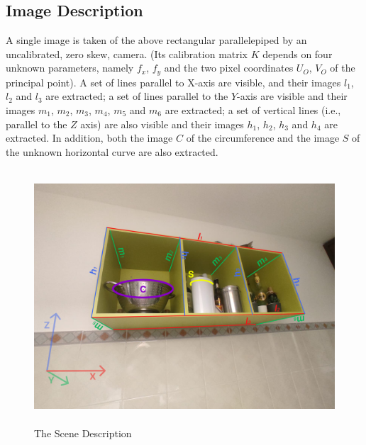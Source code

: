 \subsection{Image Description}
A single image is taken of the above rectangular parallelepiped by an uncalibrated, zero
skew, camera. (Its calibration matrix $K$ depends on four unknown parameters, namely $f_x$, $f_y$ and 
the two pixel coordinates $U_O$, $V_O$ of the principal point). A set of lines parallel to X-axis are visible, and their images $l_1$, $l_2$ and $l_3$ are extracted; a set of lines parallel to the $Y$-axis are visible and their images  $m_1$, $m_2$, $m_3$, $m_4$, $m_5$ and $m_6$ are extracted; a set of vertical lines (i.e., parallel to the $Z$
axis) are also visible and their images $h_1$, $h_2$, $h_3$ and $h_4$ are extracted.  In addition, both the image $C$ of the circumference and the image $S$ of the unknown horizontal curve are also extracted.  

\begin{figure}[!ht]
\centering
\includegraphics[height=9.5cm, width=\textwidth, keepaspectratio]{Report/Images/Introduction/Image Description.png}
\caption{\label{fig:SceneDescription}The Scene Description}
\end{figure}

